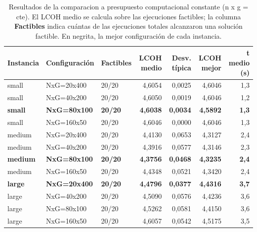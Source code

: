 \begin{table}[H]
    \centering
    \small
    \renewcommand{\arraystretch}{1.25}
    \begin{tabular}{lllrrrr}
        \hline
        \textbf{Instancia} & \textbf{Configuración} & \textbf{Factibles} & \textbf{LCOH medio} & \textbf{Desv. típica} & \textbf{LCOH mejor} & \textbf{t medio (s)} \\
        \hline
        small & NxG=20x400 & 20/20 & 4,6054 & 0,0025 & 4,6046 & 1,3 \\
        small & NxG=40x200 & 20/20 & 4,6050 & 0,0019 & 4,6046 & 1,2 \\
        \textbf{small} & \textbf{NxG=80x100} & \textbf{20/20} & \textbf{4,6038} & \textbf{0,0034} & \textbf{4,5892} & \textbf{1,3} \\
        small & NxG=160x50 & 20/20 & 4,6046 & 0,0000 & 4,6046 & 1,3 \\
        \hline
        medium & NxG=20x400 & 20/20 & 4,4130 & 0,0653 & 4,3127 & 2,4 \\
        medium & NxG=40x200 & 20/20 & 4,3916 & 0,0577 & 4,3146 & 2,3 \\
        \textbf{medium} & \textbf{NxG=80x100} & \textbf{20/20} & \textbf{4,3756} & \textbf{0,0468} & \textbf{4,3235} & \textbf{2,4} \\
        medium & NxG=160x50 & 20/20 & 4,4348 & 0,0521 & 4,3420 & 2,4 \\
        \hline
        \textbf{large} & \textbf{NxG=20x400} & \textbf{20/20} & \textbf{4,4796} & \textbf{0,0377} & \textbf{4,4316} & \textbf{3,7} \\
        large & NxG=40x200 & 20/20 & 4,5090 & 0,0576 & 4,4236 & 3,6 \\
        large & NxG=80x100 & 20/20 & 4,5262 & 0,0581 & 4,4150 & 3,6 \\
        large & NxG=160x50 & 20/20 & 4,6057 & 0,0542 & 4,5175 & 3,5 \\
        \hline
    \end{tabular}
    \caption{Resultados de la comparacion a presupuesto computacional constante (n x g = cte). El LCOH medio se calcula sobre las ejecuciones factibles; la columna \textbf{Factibles} indica cuántas de las ejecuciones totales alcanzaron una solución factible. En negrita, la mejor configuración de cada instancia.}
    \label{tab:calib_e10_presup}
\end{table}
